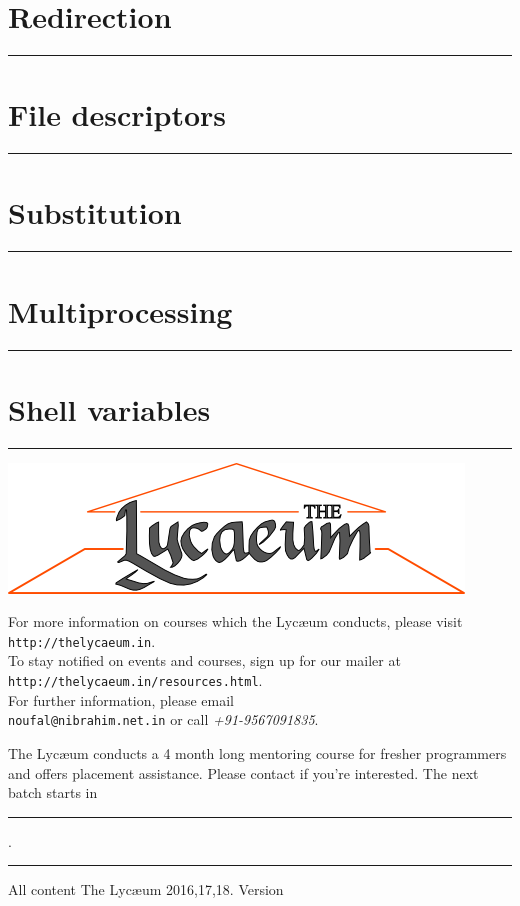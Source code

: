 \documentclass{../refsheet}
\begin{document}
\section{Redirection}

\noindent\rule{\linewidth}{0.05ex}

\section{File descriptors}

\noindent\rule{\linewidth}{0.05ex}

\section{Substitution}

\noindent\rule{\linewidth}{0.05ex}

\section{Multiprocessing}

\noindent\rule{\linewidth}{0.05ex}

\section{Shell variables}

\noindent\rule{\linewidth}{0.05ex}




\begin{center}
\includegraphics[scale=0.4]{../images/parthenon-callig.png}
\end{center}
For more information on courses which the Lyc\ae{}um conducts, please
visit \texttt{http://thelycaeum.in}. \\To stay notified on events and
courses, sign up for our mailer at \texttt{http://thelycaeum.in/resources.html}. \\For further
information, please email \\\texttt{noufal@nibrahim.net.in} or call
\textit{+91-9567091835}.
\vspace{0.5cm}

The Lyc\ae{}um conducts a 4 month long mentoring course for fresher
programmers and offers placement assistance. Please contact if you're
interested. The next batch starts in \rule{4cm}{0.1ex}.

    \textcolor{lightgray}{\noindent\rule{\linewidth}{0.05ex}}
\footnotesize All content \textcopyright The Lyc\ae{}um 2016,17,18. Version 
\end{document}
